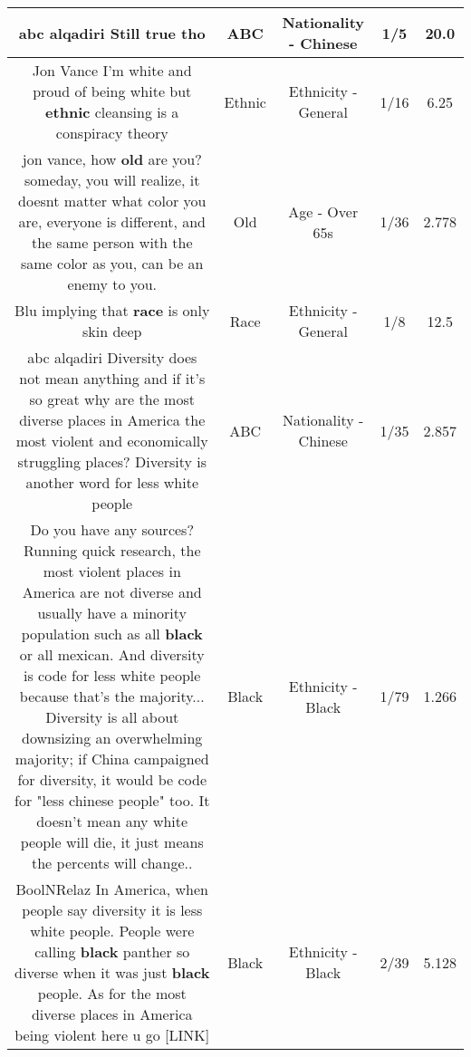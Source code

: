 \documentclass[11pt]{article}
\newlength\mylength
\begin{document}
\begin{center}
\begin{longtable}{|C{.65\mylength}|C{.30\mylength}|C{.12\mylength}|C{.12\mylength}|C{.12\mylength}|}
  \small abc alqadiri Still true tho\normalsize   & ABC & Nationality - Chinese & 1/5 & 20.0 \\  \hline
  \small Jon Vance I'm white and proud of being white but \textbf{ethnic} cleansing is a conspiracy theory\normalsize   & Ethnic & Ethnicity - General & 1/16 & 6.25 \\  \hline
  \small jon vance, how \textbf{old} are you? someday, you will realize, it doesnt matter what color you are, everyone is different, and the same person with the same color as you, can be an enemy to you.\normalsize   & Old & Age - Over 65s & 1/36 & 2.778 \\  \hline
  \small Blu implying that \textbf{race} is only skin deep\normalsize   & Race & Ethnicity - General & 1/8 & 12.5 \\  \hline
  \small abc alqadiri Diversity does not mean anything and if it's so great why are the most diverse places in America the most violent and economically struggling places? Diversity is another word for less white people\normalsize   & ABC & Nationality - Chinese & 1/35 & 2.857 \\  \hline
  \small Do you have any sources? Running quick research, the most violent places in America are not diverse and usually have a minority population such as all \textbf{black} or all mexican. And diversity is code for less white people because that's the majority... Diversity is all about downsizing an overwhelming majority; if China campaigned for diversity, it would be code for "less chinese people" too. It doesn't mean any white people will die, it just means the percents will change..\normalsize   & Black & Ethnicity - Black & 1/79 & 1.266 \\  \hline
  \small BoolNRelaz In America, when people say diversity it is less white people. People were calling \textbf{black} panther so diverse when it was just \textbf{black} people. As for the most diverse places in America being violent here u go  [LINK] \normalsize   & Black & Ethnicity - Black & 2/39 & 5.128 \\  \hline

\end{longtable}
\end{center}
\end{document}
